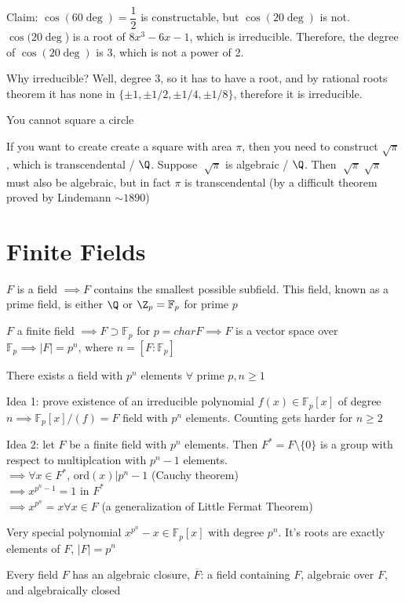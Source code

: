 \documentclass[10pt]{article}
\newcommand{\F}{\mathbb{F}}
\begin{document}
Claim: $\cos(60 \deg) = \dfrac{1}{2}$ is constructable, but $\cos(20\deg)$ is not. $\cos(20 \deg$) is a root of $8x^3 - 6x - 1$, which is irreducible. Therefore, the degree of $\cos(20\deg)$ is 3, which is not a power of 2.

Why irreducible? Well, degree 3, so it has to have a root, and by rational roots theorem it has none in $\{\pm1, \pm 1/2, \pm 1/4, \pm 1/8\}$, therefore it is irreducible.

\begin{cor}
    You cannot square a circle
\end{cor}
If you want to create create a square with area $\pi$, then you need to construct $\sqrt{\pi}$, which is transcendental / $\Q$. Suppose $\sqrt[]{\pi}$ is algebraic / $\Q$. Then $\sqrt[]{\pi} \sqrt[]{\pi}$ must also be algebraic, but in fact $\pi$ is transcendental (by a difficult theorem proved by Lindemann $\sim1890$)

\section{Finite Fields}
$F$ is a field $\implies F$ contains the smallest possible subfield. This field, known as a prime field, is either $\Q$ or $\Z_p = \F_p$ for prime $p$

$F$ a finite field $\implies F \supset \F_p$ for $p = char F \implies F$ is a vector space over $\F_p \implies |F| = p^n$, where $n = [F: \F_p]$

\begin{thm}
    There exists a field with $p^n$ elements $\forall$ prime $p, n \geq 1$
\end{thm}
Idea 1: prove existence of an irreducible polynomial $f(x) \in \F_p[x]$ of degree $n \implies \F_p[x]/(f) = F$ field with $p^n$ elements. Counting gets harder for $n \geq 2$

Idea 2: let $F$ be a finite field with $p^n$ elements. Then $F^* = F\setminus\{0\}$ is a group with respect to multiplcation with $p^n - 1$ elements.\\
$\implies \forall x \in F^*$, ord$(x) | p^n - 1$ (Cauchy theorem)\\
$\implies x^{p^n - 1} = 1$ in $F^*$\\
$\implies x^{p^n} = x \forall x \in F$ (a generalization of Little Fermat Theorem)

Very special polynomial $x^{p^n} - x \in \F_p[x]$ with degree $p^n$. It's roots are exactly elements of $F$, $|F| = p^n$

\begin{thm}
    Every field $F$ has an algebraic closure, $\overline{F}$: a field containing $F$, algebraic over $F$, and algebraically closed
\end{thm}
\end{document}
